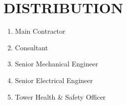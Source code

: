 \section{DISTRIBUTION}
\begin{enumerate}

\item	Main Contractor
\item	Consultant
\item	Senior Mechanical Engineer
\item	Senior Electrical Engineer
\item	Tower Health \& Safety Officer

\end{enumerate}